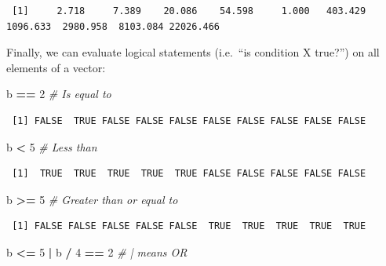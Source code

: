 \documentclass[12pt,]{book}
\newenvironment{Shaded}{\begin{snugshade}}{\end{snugshade}}
\newcommand{\CommentTok}[1]{\textcolor[rgb]{0.56,0.35,0.01}{\textit{#1}}}
\newcommand{\DecValTok}[1]{\textcolor[rgb]{0.00,0.00,0.81}{#1}}
\newcommand{\NormalTok}[1]{#1}
\newcommand{\OperatorTok}[1]{\textcolor[rgb]{0.81,0.36,0.00}{\textbf{#1}}}
\newcommand{\StringTok}[1]{\textcolor[rgb]{0.31,0.60,0.02}{#1}}
\begin{document}
\begin{verbatim}
 [1]     2.718     7.389    20.086    54.598     1.000   403.429  1096.633  2980.958  8103.084 22026.466
\end{verbatim}

Finally, we can evaluate logical statements (i.e.~``is condition X true?'') on all elements of a vector:

\begin{Shaded}
\begin{Highlighting}[]
\NormalTok{b }\OperatorTok{==}\StringTok{ }\DecValTok{2}                     \CommentTok{# Is equal to}
\end{Highlighting}
\end{Shaded}

\begin{verbatim}
 [1] FALSE  TRUE FALSE FALSE FALSE FALSE FALSE FALSE FALSE FALSE
\end{verbatim}

\begin{Shaded}
\begin{Highlighting}[]
\NormalTok{b }\OperatorTok{<}\StringTok{ }\DecValTok{5}                      \CommentTok{# Less than}
\end{Highlighting}
\end{Shaded}

\begin{verbatim}
 [1]  TRUE  TRUE  TRUE  TRUE  TRUE FALSE FALSE FALSE FALSE FALSE
\end{verbatim}

\begin{Shaded}
\begin{Highlighting}[]
\NormalTok{b }\OperatorTok{>=}\StringTok{ }\DecValTok{5}                     \CommentTok{# Greater than or equal to }
\end{Highlighting}
\end{Shaded}

\begin{verbatim}
 [1] FALSE FALSE FALSE FALSE FALSE  TRUE  TRUE  TRUE  TRUE  TRUE
\end{verbatim}

\begin{Shaded}
\begin{Highlighting}[]
\NormalTok{b }\OperatorTok{<=}\StringTok{ }\DecValTok{5} \OperatorTok{|}\StringTok{ }\NormalTok{b }\OperatorTok{/}\StringTok{ }\DecValTok{4} \OperatorTok{==}\StringTok{ }\DecValTok{2}        \CommentTok{# | means OR}
\end{Highlighting}
\end{Shaded}
\end{document}
